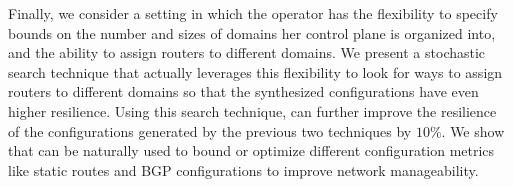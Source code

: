 Finally, we consider a setting in which the operator has the
flexibility to specify bounds on the number and sizes of domains her
control plane is organized into, and the ability to assign routers to
different domains.  We present a stochastic search technique that
actually leverages this flexibility to look for ways to assign routers
to different domains so that the synthesized configurations have even
higher resilience.  Using this search technique, \name can further
improve the resilience of the configurations generated by the previous
two techniques by $10\%$. We show that \name can be naturally used to
bound or optimize different configuration metrics like static routes
and BGP configurations to improve network manageability.


  






